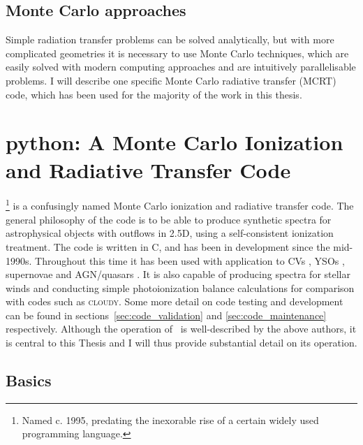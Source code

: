 \subsection{Monte Carlo approaches}

Simple radiation transfer problems can be solved analytically,
but with more complicated geometries it is necessary to use Monte Carlo
techniques, which are easily solved with modern computing approaches and 
are intuitively parallelisable problems. I will describe one specific 
Monte Carlo radiative transfer (MCRT) code, which has been used
for the majority of the work in this thesis.










\section{{\sc python}: A Monte Carlo Ionization and Radiative Transfer Code}
\label{sec:python}

\py\footnote{Named c. 1995, predating the inexorable rise of a certain widely used
programming language.} is a confusingly named 
Monte Carlo ionization and radiative transfer code. 
The general philosophy of the code is to be able to produce synthetic spectra
for astrophysical objects with outflows in 2.5D, using a self-consistent ionization 
treatment. The code is written in C, and has been in development since the mid-1990s.
Throughout this time it has been used with application to CVs \citep{LK02, M15},
YSOs \citep{simmacro2005}, supernovae \citep{kerzendorfsim} and AGN/quasars 
\citep{higginbottom2013,H14,M16}. It is also capable of producing spectra 
for stellar winds and conducting simple photoionization balance calculations for
comparison with codes such as \textsc{cloudy}. Some more detail on code testing and 
development can be found in sections~\ref{sec:code_validation} and \ref{sec:code_maintenance}
respectively. Although the operation of \py\ is well-described by the above authors,
it is central to this Thesis and I will thus provide substantial detail on its operation. 

\subsection{Basics}

